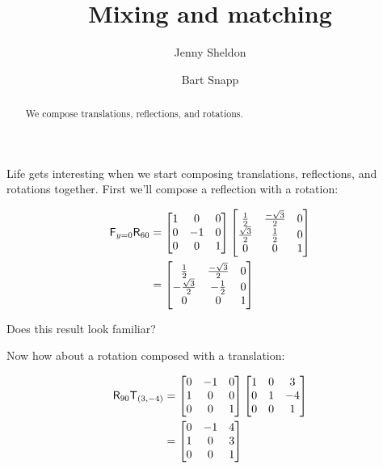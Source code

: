 \documentclass{ximera}
\author{Jenny Sheldon \and Bart Snapp}
\title{Mixing and matching}
\begin{document}
\begin{abstract}
  We compose translations, reflections, and rotations.
\end{abstract}
\maketitle
Life gets interesting when we start composing translations,
reflections, and rotations together.  First we'll compose a reflection
with a rotation:

\begin{align*}
\mathsf{F}_{y=0}\mathsf{R}_{60} &= \begin{bmatrix}
1 &  0 & 0\\
0 & -1 & 0\\
0 &  0 & 1
\end{bmatrix}
\begin{bmatrix}
\frac{1}{2} & \frac{-\sqrt{3}}{2} & 0\\ \frac{\sqrt{3}}{2} &
\frac{1}{2} & 0\\ 0 & 0 & 1
\end{bmatrix}\\
&= \begin{bmatrix}
\frac{1}{2} & \frac{-\sqrt{3}}{2} & 0\\
-\frac{\sqrt{3}}{2} & -\frac{1}{2} & 0\\
0 & 0 & 1
\end{bmatrix}
\end{align*}

\begin{question}
Does this result look familiar?
\end{question}


Now how about a rotation composed with a translation:

\begin{align*}
\mathsf{R}_{90}\mathsf{T}_{(3,-4)} &= \begin{bmatrix}
0 & -1 & 0\\
1 & 0 & 0\\
0 & 0 & 1
\end{bmatrix}
\begin{bmatrix}
1 & 0 & 3\\
0 & 1 & -4\\
0 & 0 & 1
\end{bmatrix}\\
&=
\begin{bmatrix}
0 & -1 & 4\\
1 & 0 & 3\\
0 & 0 & 1
\end{bmatrix}
\end{align*}
\end{document}
